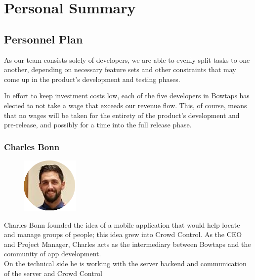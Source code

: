 
\graphicspath{ {Pictures/} }

\chapter{Personal Summary}

\section{Personnel Plan}

As our team consists solely of developers, we are able to evenly split tasks to one another, depending on necessary feature sets and other constraints that may come up in the product’s development and testing phases.

In effort to keep investment costs low, each of the five developers in Bowtaps has elected to not take a wage that exceeds our revenue flow. This, of course, means that no wages will be taken for the entirety of the product’s development and pre-release, and possibly for a time into the full release phase.\\





\subsection{Charles Bonn}
\begin{figure}
\includegraphics{charlesbonn}
\end{figure}

Charles Bonn founded the idea of a mobile application that would help locate and manage groups of people; this idea grew into Crowd Control. As the CEO and Project Manager, Charles acts as the intermediary between Bowtaps and the community of app development. \\
On the technical side he is working with the server backend and communication of the server and Crowd Control \\
\newline
\newline
\newline

